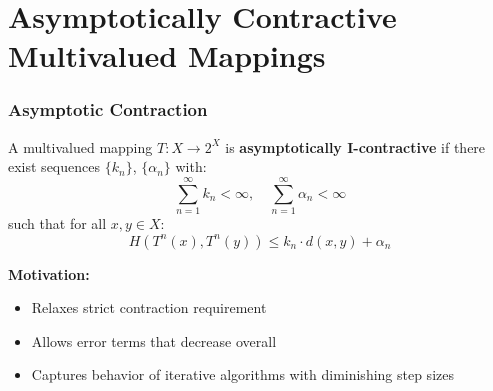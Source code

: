\documentclass[aspectratio=169,10pt]{beamer}
\begin{document}

\section{Asymptotically Contractive Multivalued Mappings}

\begin{frame}
\frametitle{Asymptotic Contraction}

\begin{definition}
A multivalued mapping $T: X \to 2^X$ is \textbf{asymptotically I-contractive} if there exist
sequences $\{k_n\}$, $\{\alpha_n\}$ with:
\[
\sum_{n=1}^\infty k_n < \infty, \quad \sum_{n=1}^\infty \alpha_n < \infty
\]
such that for all $x, y \in X$:
\[
H(T^n(x), T^n(y)) \leq k_n \cdot d(x,y) + \alpha_n
\]
\end{definition}

\vspace{0.3cm}

\textbf{Motivation:}
\begin{itemize}
    \item Relaxes strict contraction requirement
    \item Allows error terms that decrease overall
    \item Captures behavior of iterative algorithms with diminishing step sizes
\end{itemize}

\end{frame}
\end{document}
